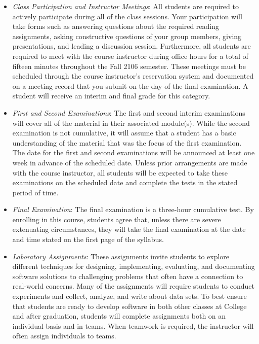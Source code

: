 \begin{itemize}

  \item {\em Class Participation and Instructor Meetings\/}: All students are required to actively participate during all
    of the class sessions. Your participation will take forms such as answering questions about the required reading
    assignments, asking constructive questions of your group members, giving presentations, and leading a discussion
    session. Furthermore, all students are required to meet with the course instructor during office hours for a total
    of fifteen minutes throughout the Fall 2106 semester. These meetings must be scheduled through the course
    instructor's reservation system and documented on a meeting record that you submit on the day of the final
    examination. A student will receive an interim and final grade for this category.

  \item {\em First and Second Examinations\/}: The first and second interim examinations will cover all of the material in
    their associated module(s).  While the second examination is not cumulative, it will assume that a student has a
    basic understanding of the material that was the focus of the first examination.  The date for the first and second
    examinations will be announced at least one week in advance of the scheduled date.  Unless prior arrangements are
    made with the course instructor, all students will be expected to take these examinations on the scheduled date and
    complete the tests in the stated period of time.

  \item {\em Final Examination\/}: The final examination is a three-hour cumulative test.  By enrolling in this course,
    students agree that, unless there are severe extenuating circumstances, they will take the final examination at the
    date and time stated on the first page of the syllabus.

  \item {\em Laboratory Assignments\/}: These assignments invite students to explore different techniques for designing,
    implementing, evaluating, and documenting software solutions to challenging problems that often have a connection to
    real-world concerns. Many of the assignments will require students to conduct experiments and collect, analyze, and
    write about data sets. To best ensure that students are ready to develop software in both other classes at
    College and after graduation, students will complete assignments both on an individual basis and in teams.
    When teamwork is required, the instructor will often assign individuals to teams.


\end{itemize}
